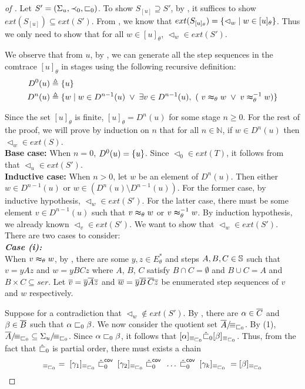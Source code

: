 \documentclass{llncs}
\begin{document}
\begin{proof}[of ] Let $S'=(\Sigma_{u},\prec_{0},\sqsubset_{0})$. To show $S_{[u]} \supseteq S'$, by , it suffices to show $ext(S_{[u]} )\subseteq ext(S')$. From , we know that $ext(S_{[u]_{\theta}}) = \{\lhd_w\mid w\in [u]_{\theta}\}$. Thus we only need to show that for all $w\in [u]_{\theta}$, $\lhd_w \in ext(S')$.

We observe that from $u$, by , we can generate all the step sequences in the comtrace $[u]_{\theta}$ in stages using the following recursive definition:
\begin{align*}
D^0(u)&\triangleq \{u\}\\
D^n(u)&\triangleq \{w\mid w\in D^{n-1}(u)\;\vee\; \exists v\in D^{n-1}(u),\ (\ v\thickapprox_{\theta} w\; \vee\; v\thickapprox_{\theta}^{-1} w)\} 
\end{align*}

Since the set $[u]_{\theta}$ is finite, $[u]_{\theta}=D^n(u)$ for some stage $n\ge 0$. For the rest of the proof, we will prove by induction on $n$ that for all $n\in \mathbb{N}$, if $w\in D^n(u)$ then $\lhd_w\in ext(S)$. \\
\textbf{Base case:} When $n=0$, $D^0(u)=\{u\}$. Since $\lhd_0 \in ext(T)$, it follows from  that $\lhd_u \in ext(S')$. \\
\textbf{Inductive case:} When $n>0$, let $w$ be an element of $D^n(u)$. Then either $w\in D^{n-1}(u)$ or $w\in (D^n(u)\setminus D^{n-1}(u))$. For the former case, by inductive hypothesis, $\lhd_w\in ext(S')$. For the latter case, there must be some element $v\in D^{n-1}(u)$ such that $v\thickapprox_{\theta} w$ or  $v\thickapprox_{\theta}^{-1} w$. By induction hypothesis, we already known $\lhd_v\in ext(S')$. We want to show that $\lhd_w \in ext(S')$. There are two cases to consider:\smallskip\\
\textit{\textbf{Case (i):}} \\
When $v\thickapprox_{\theta} w$, by , there are some $y,z\in E_{\theta}^*$ and steps $A,B,C\in \mathbb{S}$ such that $v=yAz$ and $w=yBCz$ where $A$, $B$, $C$ satisfy $B\cap C =\emptyset$ and $B\cup C = A$ and $B\times C\subseteq ser$. Let $\overline{v}=\overline{y}\overline{A}\overline{z}$ and $\overline{w}=\overline{y}\overline{B}\,\overline{C}\overline{z}$ be enumerated step sequences of $v$ and $w$ respectively. 

Suppose for a contradiction that $\lhd_w \not\in ext(S')$. By , there are $\alpha\in \overline{C}$  and $\beta \in \overline{B}$ such that $\alpha \sqsubset_{0} \beta$. We now consider the quotient set ${\overline{A}}/\!{\equiv_{\sqsubset_{0}}}$. By   (1), ${\overline{A}}/\!{\equiv_{\sqsubset_{0}}} \subseteq {\Sigma_{u}}/\!{\equiv_{\sqsubset_{0}}}$. 
Since $\alpha \sqsubset_{0} \beta$, it follows that $[\alpha]_{\equiv_{\sqsubset_{0}}}\hat{\sqsubset}_{0} [\beta]_{\equiv_{\sqsubset_{0}}}$. Thus, from the fact that $\hat{\sqsubset}_{0}$ is partial order, there must exists a chain
\begin{align}
[\alpha]_{\equiv_{\sq_{0}}}=\; [\gamma_1]_{\equiv_{\sq_{0}}} \;\imm{\hat{\sq}_{0}}\; [\gamma_2]_{\equiv_{\sq_{0}}}\;\imm{\hat{\sq}_{0}}\; \ldots\;\imm{\hat{\sq}_{0}}\;[\gamma_k]_{\equiv_{\sq_{0}}}\;= [\beta]_{\equiv_{\sq_{0}}} 
\label{eq:chain1}
\end{align}


\end{proof}
\end{document}
